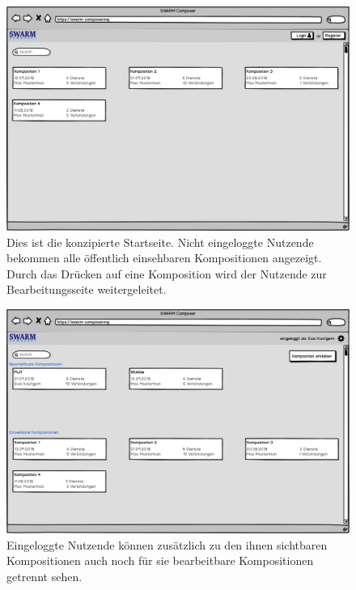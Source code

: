 \begin{figure}[h]
	\centering
	\includegraphics[width=\textwidth]{img/kompositionen}
	\caption{
            Dies ist die konzipierte Startseite. Nicht eingeloggte Nutzende bekommen alle
            öffentlich einsehbaren Kompositionen angezeigt. Durch das Drücken
            auf eine Komposition wird der Nutzende zur Bearbeitungsseite weitergeleitet.
        }
	\label{fig:kompositionen}
\end{figure}

\begin{figure}[h]
	\centering
	\includegraphics[width=\textwidth]{img/kompositionen_eingeloggt}
	\caption{
          Eingeloggte Nutzende können zusätzlich zu den ihnen sichtbaren Kompositionen
          auch noch für sie bearbeitbare Kompositionen getrennt sehen.
        }
	\label{fig:kompositionen-eingeloggt}
\end{figure}

